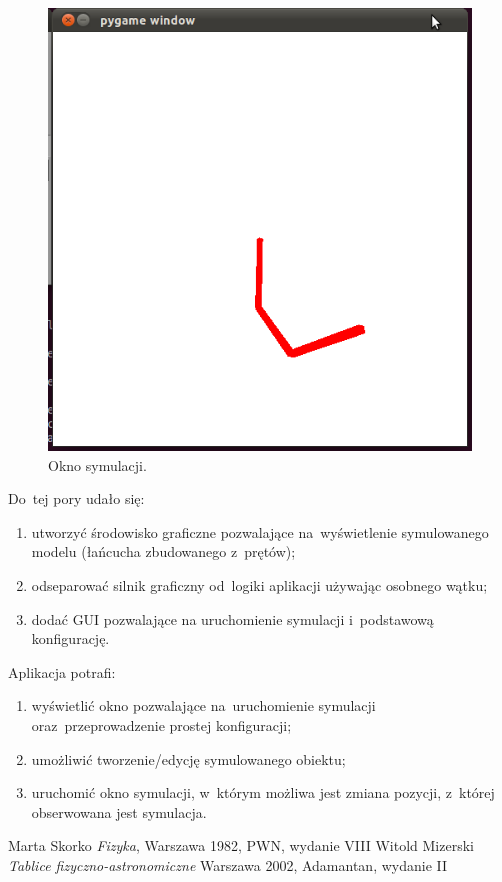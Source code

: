 \documentclass{classrep}
\begin{document}
\begin{figure}[htb]
\centering
\includegraphics[scale=0.5]{img/sim.png}
\caption{Okno symulacji.}
\label{img:gui}
\end{figure}

Do~tej pory udało się:

\begin{enumerate}
  \item utworzyć środowisko graficzne pozwalające na~wyświetlenie symulowanego
  modelu (łańcucha zbudowanego z~prętów);
  \item odseparować silnik graficzny od~logiki aplikacji używając osobnego wątku;
  \item dodać GUI pozwalające na uruchomienie symulacji i~podstawową konfigurację.
\end{enumerate}


Aplikacja potrafi:

\begin{enumerate}
  \item wyświetlić okno pozwalające na~uruchomienie symulacji oraz~przeprowadzenie
  prostej konfiguracji;
  \item umożliwić tworzenie/edycję symulowanego obiektu;
  \item uruchomić okno symulacji, w~którym możliwa jest zmiana pozycji, z~której
  obserwowana jest symulacja.
\end{enumerate}


\begin{thebibliography}{0}
   Marta Skorko
    \textsl{Fizyka}, Warszawa 1982, PWN, wydanie VIII
   Witold Mizerski
    \textsl{Tablice fizyczno-astronomiczne} Warszawa 2002, Adamantan, wydanie II
\end{thebibliography}
\end{document}
